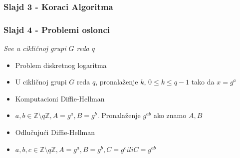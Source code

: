 \documentclass[14pt]{beamer}
\begin{document}
\begin{frame}[fragile]\frametitle{Slajd 3 - Koraci Algoritma}
    \begin{table}[h]
        \begin{center}
        \caption{Tajnost promenljivih u toku algoritma}
        \end{center}
    \end{table}

\end{frame}

\begin{frame}[fragile]\frametitle{Slajd 4 - Problemi oslonci}
    \small
    \emph{Sve u cikličnoj grupi $G$ reda $q$}
	\begin{itemize}	
		\item Problem diskretnog logaritma
        \item[] U cikličnoj grupi $G$ reda $q$, pronalaženje $k$, $0 \le k \le q - 1$ tako da $x = g^a$ \pause
        \item Komputacioni Diffie-Hellman
        \item[] $a, b \in \mathbb{Z}\setminus q\mathbb{Z}, A = g^a, B = g^b$. Pronalaženje $g^{ab}$ ako znamo $A,B$ \pause
        \item Odlučujući Diffie-Hellman
        \item[] $a, b, c \in \mathbb{Z}\setminus q\mathbb{Z}, A=g^a, B=g^b, C=g^c ili C=g^{ab}$
	\end{itemize}
\end{frame}
\end{document}
